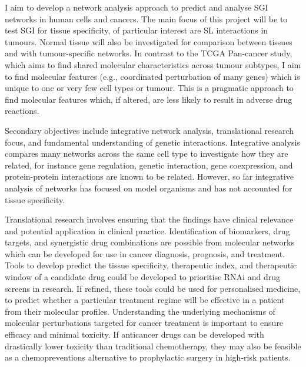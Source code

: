 \iffalse
I aim to develop a network analysis approach to predict and analyse \gls{SGI} networks in human cells and cancers. The main focus of this project will be to test \gls{SGI} for tissue specificity, of particular interest are SL interactions in \glspl{tumour}. Normal tissue will also be investigated for comparison between tissues and with tumour-specific networks. In contrast to the \gls{TCGA} Pan-cancer study, which aims to find shared molecular characteristics across tumour subtypes, I aim to find molecular features (e.g., coordinated perturbation of many genes) which is unique to one or very few cell types or tumour. This is a pragmatic approach to find molecular features which, if altered, are less likely to result in adverse drug reactions.

Secondary objectives include integrative network analysis, translational research focus, and fundamental understanding of genetic interactions. Integrative analysis compares many networks across the same cell type to investigate how they are related, for instance gene regulation, genetic interaction, gene coexpression, and protein-protein interactions are known to be related. However, so far integrative analysis of networks has focused on model organisms and has not accounted for tissue specificity.

Translational research involves ensuring that the findings have clinical relevance and potential application in clinical practice. Identification of biomarkers, drug targets, and synergistic drug combinations are possible from molecular networks which can be developed for use in cancer diagnosis, prognosis, and treatment. Tools to develop predict the tissue specificity, therapeutic index, and therapeutic window of a candidate drug could be developed to prioritise \gls{RNAi} and drug screens in research. If refined, these tools could be used for personalised medicine, to predict whether a particular treatment regime will be effective in a patient from their \glspl{molecular profile}. Understanding the underlying mechanisms of molecular perturbations targeted for cancer treatment is important to ensure efficacy and minimal toxicity. If anticancer drugs can be developed with drastically lower toxicity than traditional \gls{chemotherapy}, they may also be feasible as a \glspl{chemoprevention} alternative to prophylactic surgery in high-risk patients.


